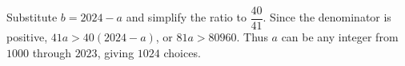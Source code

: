 Substitute $b=2024-a$ and simplify the ratio to $\dfrac{40}{41}$. Since the denominator is positive, $41a>40(2024-a)$, or $81a>80960$. Thus $a$ can be any integer from $1000$ through $2023$, giving $\boxed{1024}$ choices.
